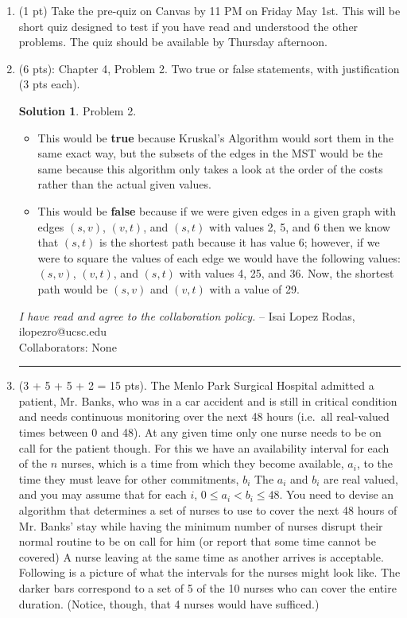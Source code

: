 \documentclass[11pt]{article}
\theoremstyle{definition}
\newtheorem*{solution}{Solution}
\begin{document}
\begin{enumerate}

\item (1 pt) Take the pre-quiz on Canvas by 11 PM on Friday May 1st.  This will be short quiz designed to test
 if you have read and understood the other problems.  The quiz should be available by Thursday afternoon.


\item (6 pts):  Chapter 4, Problem 2. Two true or false statements, with justification (3 pts each).
\begin{solution}
Problem 2.
\begin{itemize}
    \item This would be \textbf{true} because Kruskal's Algorithm would sort them in the same exact way, but the subsets of the edges in the MST would be the same because this algorithm 
    only takes a look at the order of the costs rather than the actual given values. 
     \item This would be \textbf{false} because if we were given edges in a given graph with edges $(s,v)$, $(v,t)$, and $(s,t)$ with values 2, 5, and 6 then we know that $(s,t)$ is the shortest
	 path because it has value 6; however, if we were to square the values of each edge we would have the following values: $(s,v)$, $(v,t)$, and $(s,t)$ with values 4, 25, and 36. Now, the shortest path
	would be $(s,v)$ and $(v,t)$ with a value of 29. 
\end{itemize}
\end{solution}
\newpage
\emph{I have read and agree to the collaboration policy.}  -- Isai Lopez Rodas, ilopezro@ucsc.edu
\\
Collaborators: None%
\\
\hrule
\item (3 + 5 + 5 + 2 = 15 pts). 
The Menlo Park Surgical Hospital admitted a patient, Mr. Banks, who was in a car accident and is still in critical condition and needs continuous monitoring over the next 48 hours (i.e.~all real-valued times between 0 and 48).
At any given time only one nurse needs to be on call for the patient though. 
For this we have an availability interval for each of the $n$ nurses, 
which is a time from which they become available, $a_i$, to the time they must leave for other commitments, $b_i$
The $a_i$ and $b_i$ are real valued, and you may assume that for each $i$, $0\leq a_i < b_i \leq 48$.
You need to devise an algorithm that determines a set of nurses to use to cover the next 48 hours of Mr. Banks' stay while having the minimum number of nurses disrupt their normal routine to be on call for him (or report that some time cannot be covered)
A nurse leaving at the same time as another arrives is acceptable. 
Following is a picture of what the intervals for the nurses might look like. 
The darker bars correspond to a set 
of 5 of the 10 nurses who can cover the entire duration. (Notice, though, that 4 nurses would have sufficed.)


\end{enumerate}
\end{document}

